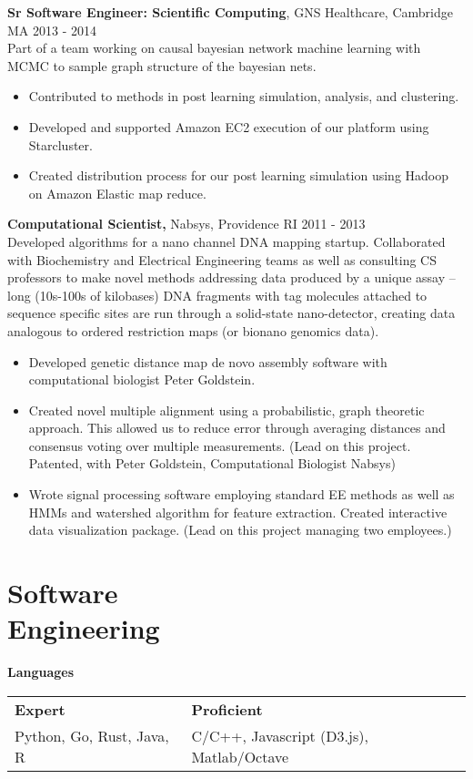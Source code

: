 \documentclass[margin]{res}
\begin{document}
\begin{resume}
{\bf Sr Software Engineer: Scientific Computing}, GNS Healthcare, Cambridge MA \hfill 2013 - 2014 \\
Part of a team working on causal bayesian network machine learning with MCMC to sample graph structure of the bayesian nets. \\
\begin{itemize}
\item Contributed to methods in post learning simulation, analysis, and clustering.
\item Developed and supported Amazon EC2 execution of our platform using Starcluster.
\item Created distribution process for our post learning simulation using Hadoop on Amazon Elastic map reduce. 
\end{itemize}


{\bf Computational Scientist,} Nabsys, Providence RI \hfill 2011 - 2013 \\
Developed algorithms for a nano channel DNA mapping startup. Collaborated with Biochemistry and Electrical Engineering teams as well as consulting CS professors to make novel methods addressing data produced by a unique assay -- long (10s-100s of kilobases) DNA fragments with tag molecules attached to sequence specific sites are run through a solid-state nano-detector, creating data analogous to ordered restriction maps (or bionano genomics data). \\

\begin{itemize} %
\item Developed genetic distance map de novo assembly software with computational biologist Peter Goldstein. 
\item Created novel multiple alignment using a probabilistic, graph theoretic approach. This allowed us to reduce error through averaging distances and consensus voting over multiple measurements. (Lead on this project. Patented, with Peter Goldstein, Computational Biologist Nabsys)
\item Wrote signal processing software employing standard EE methods as well as HMMs and watershed algorithm for feature extraction. Created interactive data visualization package. (Lead on this project managing two employees.)
\end{itemize}


\section{Software \\Engineering}
{\bf Languages}
\begin{tabular}{l l}
{\bf Expert} & {\bf Proficient} \\
Python, Go, Rust, Java, R & C/C++, Javascript (D3.js), Matlab/Octave \\
\end{tabular}



\end{resume}
\end{document}
